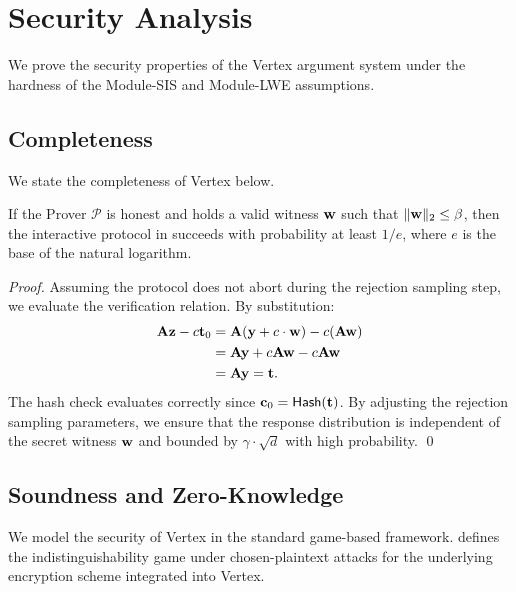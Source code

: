 \section{Security Analysis}
\label{sec:security}

We prove the security properties of the Vertex argument system under the hardness of the Module-SIS and Module-LWE assumptions.

\subsection{Completeness}
We state the completeness of Vertex below.
\begin{theorem}[Completeness]
  If the Prover $\mathcal{P}$ is honest and holds a valid witness $\mathbf{w}$ such that $\|\mathbf{w}\|_2 \le \beta$, then the interactive protocol in  succeeds with probability at least $1/e$, where $e$ is the base of the natural logarithm.
\end{theorem}

\begin{proof}
  Assuming the protocol does not abort during the rejection sampling step, we evaluate the verification relation.
  By substitution:
  \begin{align}
    \mathbf{A}\mathbf{z} - c \mathbf{t}_0 &= \mathbf{A}(\mathbf{y} + c \cdot \mathbf{w}) - c(\mathbf{A}\mathbf{w}) \\
    &= \mathbf{A}\mathbf{y} + c\mathbf{A}\mathbf{w} - c\mathbf{A}\mathbf{w} \\
    &= \mathbf{A}\mathbf{y} = \mathbf{t}.
  \end{align}
  The hash check evaluates correctly since $\mathbf{c}_0 = \mathsf{Hash}(\mathbf{t})$. By adjusting the rejection sampling parameters, we ensure that the response distribution is independent of the secret witness $\mathbf{w}$ and bounded by $\gamma \cdot \sqrt{d}$ with high probability. \qed
\end{proof}

\subsection{Soundness and Zero-Knowledge}
We model the security of Vertex in the standard game-based framework.  defines the indistinguishability game under chosen-plaintext attacks for the underlying encryption scheme integrated into Vertex.

